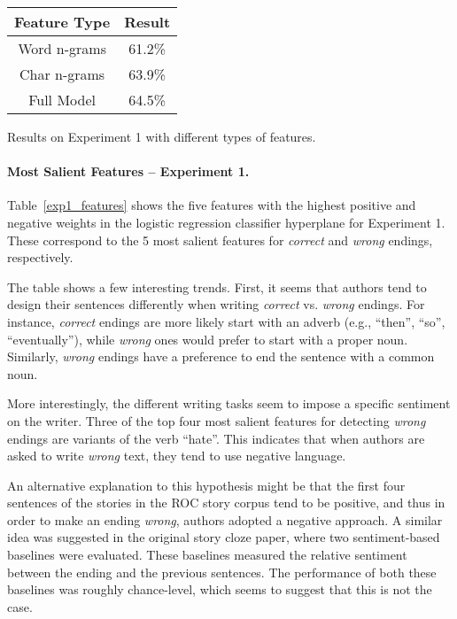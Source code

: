 \documentclass[11pt,a4paper]{article}
\newcommand{\tabref}[1]{Table~\ref{#1}}
\begin{document}
\begin{table}[!t]
\begin{center}
\begin{tabular}{|c|c|} \hline
{\bf Feature Type} & {\bf Result}\\ \hline
Word n-grams & 61.2\% \\ \hline
Char n-grams & 63.9\% \\ \hline
Full Model & 64.5\% \\ \hline

\end{tabular}
\end{center}
\caption{\label{subgroups}}
Results on Experiment 1 with different types of features.
\end{table}

\paragraph{Most Salient Features -- Experiment 1.}
\tabref{exp1_features} shows the five features with the highest positive and negative weights in the logistic regression classifier hyperplane for Experiment 1. 
These correspond to the 5 most salient features for {\it correct} and {\it wrong} endings, respectively.

The table shows a few interesting trends. 
First, it seems that authors tend to design their sentences differently when writing {\it correct}  vs. {\it wrong} endings.
For instance, {\it correct} endings are more likely start with an adverb (e.g., ``then'', ``so'', ``eventually''), while {\it wrong} ones would prefer to start with a proper noun.
Similarly, {\it wrong} endings have a preference to end the sentence with a common noun. 

More interestingly, the different writing tasks seem to impose a specific sentiment on the writer. 
Three of the top four most salient features for detecting {\it wrong} endings are variants of the verb ``hate''.
This indicates that when authors are asked to write {\it wrong} text, they tend to use negative language.

An alternative explanation to this hypothesis might be that the first four sentences of the stories in the ROC story corpus tend to be positive, and thus in order to make an ending {\it wrong}, authors adopted a negative approach. 
A similar idea was suggested in the original story cloze paper, where two sentiment-based baselines were evaluated. 
These baselines measured the relative sentiment between the ending and the previous sentences.
The performance of both these baselines was roughly chance-level, which seems to suggest that this is not the case.
\end{document}
